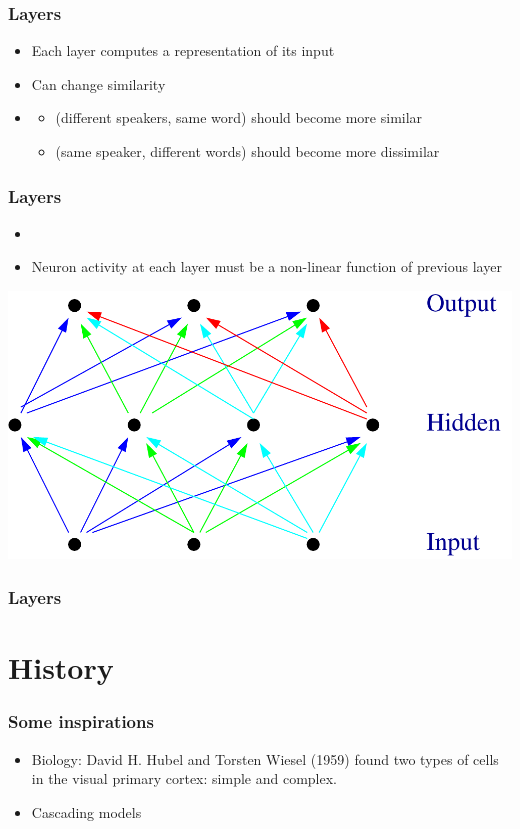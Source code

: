 \begin{frame}
  \frametitle{Layers}
  \begin{itemize}
  \item Each layer computes a representation of its input
  \item Can change similarity
  \item<2-> 
    \begin{itemize}
    \item (different speakers, same word) should become more similar
    \item (same speaker, different words) should
      become more dissimilar
    \end{itemize}
  \end{itemize}
\end{frame}

\begin{frame}
  \frametitle{Layers}
  \begin{itemize}
  \item {}
  \item Neuron activity at each layer must be a non-linear function of
    previous layer
  \end{itemize}
  \includegraphics[width=.6\textwidth]{neural-network.pdf}
\end{frame}

\begin{frame}
  \frametitle{Layers}
  
\end{frame}

\section{History}

\begin{frame}
  \frametitle{Some inspirations}
  \begin{itemize}
  \item Biology: David H. Hubel and Torsten Wiesel (1959) found two
    types of cells in the visual primary cortex: simple and complex.
  \item Cascading models
  \end{itemize}

\end{frame}

